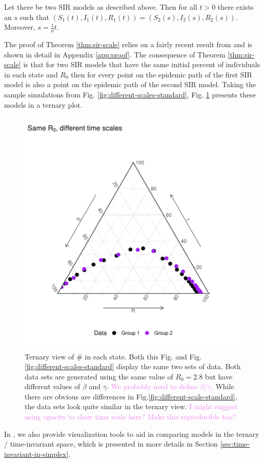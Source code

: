 \documentclass[
  shortnames]{jss}
\begin{document}
\begin{theorem}\label{thm:sir-scale}
Let there be two SIR models as described above.  Then for all $t > 0$ there exists an $s$ such that $(S_1(t), I_1(t), R_1(t)) = (S_2(s), I_2(s), R_2(s))$.  Moreover, $s = \frac{1}{a}t$.
\end{theorem}

The proof of Theorem \ref{thm:sir-scale} relies on a fairly recent
result from \cite{Harko2014} and is shown in detail in Appendix
\ref{app:proof}. The consequence of Theorem \ref{thm:sir-scale} is that
for two SIR models that have the same initial percent of individuals in
each state and \(R_0\) then for every point on the epidemic path of the
first SIR model is also a point on the epidemic path of the second SIR
model. Taking the sample simulations from Fig.
\ref{fig:different-scales-standard}, Fig.
\ref{fig:different-scales-tern} presents these models in a ternary plot.

\begin{figure}[!ht]
    \centering
    \includegraphics[width = .5\textwidth]{images/diff-time-ternary.pdf}
    \caption{Ternary view of \# in each state.  Both this Fig. and Fig. \ref{fig:different-scales-standard} display the same two sets of data.  Both data sets are generated using the same value of $R_0 = 2.8$ but have different values of $\beta$ and $\gamma$. \textcolor{violet}{We probably need to define $\beta/\gamma$.}  While there are obvious are differences in Fig.\ref{fig:different-scale-standard}, the data sets look quite similar in the ternary view. \textcolor{violet}{I might suggest using opacity to show time scale here?} \textcolor{violet}{Make this reproducible too?}}
    \label{fig:different-scales-tern}
\end{figure}

In , we also provide visualization tools to aid in
comparing models in the ternary / time-invariant space, which is
presented in more details in Section
\ref{sec:time-invariant-in-simplex}.
\end{document}
